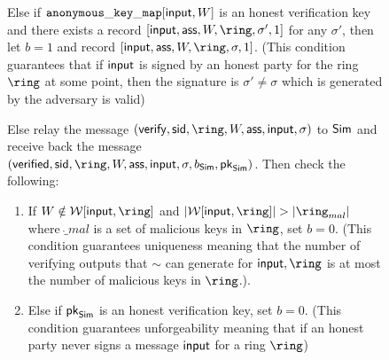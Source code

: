 \begin{figure}
\begin{tcolorbox}[left=2pt,right=2pt]
{\begin{list}{\hspace*{1pt} C}{\setlength\leftmargin{0.15in}}
				\label{cond:consistency}
				\item Else if $ \mathtt{anonymous\_key\_map}[\mathsf{input},W]  $ is an honest verification key and  there exists a record $ [\msg,\aux, W,\ring, \sigma', 1] $ for any $ \sigma' $, then let $ b=1 $ and record $ [\msg,\aux, W,\ring,\sigma, 1] $. (This condition guarantees that if $ \mathsf{input} $ is signed by an honest party for the ring $ \ring $ at some point, then the signature is $ \sigma' \neq \sigma $ which is generated by the adversary is valid) \label{cond:differentsignature}
				
				\item \label{cond:malicioussignature}Else relay the message $(\oramsg{verify}, \sid, \ring,W,\aux, \msg, \sigma)$ to $ \mathsf{Sim} $ and receive back the message $(\oramsg{verified}, \sid, \ring,W,\aux, \msg, \sigma, b_{\simulator}, \pk_\simulator)$.  Then check the following:

				\begin{enumerate}
					\item If $ W \notin \anonymouskeylist[\msg,\ring] $ and $ |\anonymouskeylist[\msg, \ring]| > |\ring_{mal}| $ where $ \ring_{mal} $ is a set of malicious keys in $ \ring $, set $ b = 0 $.
					(This condition guarantees  uniqueness meaning that the number of verifying outputs that $ \sim $ can generate for $ \msg, \ring $ is at most the  number of malicious keys in $ \ring $.)\label{cond:uniqueness}.
					
					\item Else if $ \mathsf{pk}_{\mathsf{Sim}} $ is an honest verification key, set $ b = 0 $. (This condition guarantees unforgeability meaning that if an honest party never signs a message $ \mathsf{input}$ for a ring $ \ring $)\label{cond:forgery}
					

\end{enumerate}
\end{list}}
\end{tcolorbox}
\end{figure}

